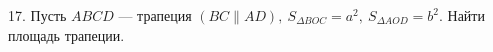 17. Пусть $ABCD$ --- трапеция $(BC\parallel AD),\ S_{\Delta BOC}=a^2,\ S_{\Delta AOD}=b^2.$ Найти площадь трапеции.\\
